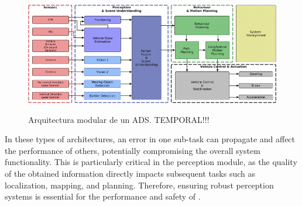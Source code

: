 \begin{figure}[H]
    \centering
    \includegraphics[width=\linewidth]{images/sota/ADS_information_flow.png}
    \label{sota_ads_information_flow}
    \caption{Arquitectura modular de un ADS. TEMPORAL!!!}
\end{figure}


In these types of architectures, an error in one \mbox{sub-task} can propagate and affect the performance of others, potentially compromising the overall system functionality. This is particularly critical in the perception module, as the quality of the obtained information directly impacts subsequent tasks such as localization, mapping, and planning. Therefore, ensuring robust perception systems is essential for the performance and safety of .


